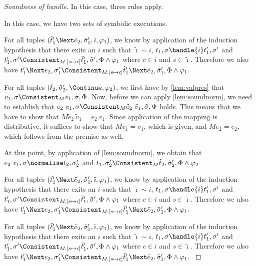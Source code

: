 \begin{proof}[Soundness of handle]
{ In this case, three rules apply.\\


{
In this case, we have two sets of symbolic executions.

For all tuples $(\tilde{t}_1'\Next \tilde{e}_2,\tilde{\sigma}_1',\tilde{\imath},\phi_1)$, we know by application of the induction hypothesis that
there exits an $i$ such that $\tilde{\imath}\sim i$, $t_1,\sigma\handle{i}t_1',\sigma'$ and
$t_1',\sigma'\Consistent_{M.[s\mapsto c]}\tilde{t}_1',\tilde{\sigma}',\Phi\land\phi_1$ where $c\in i$ and $s\in \tilde{\imath}$.
Therefore we also have $t_1'\Next e_2,\sigma_1'\Consistent_{M.[s\mapsto c]}\tilde{t}_1'\Next \tilde{e}_2,\tilde{\sigma}_1',\Phi\land\phi_1$.

For all tuples $(\tilde{t}_2,\tilde{\sigma}_2',\Continue,\phi_2)$, we first have by \cref{lem:valpres} that
$v_1,\sigma\Consistent_M\tilde{v}_1,\tilde{\sigma},\Phi$.
Now, before we can apply \cref{lem:soundnorm}, we need to establish that
$e_2\ v_1,\sigma\Consistent_M\tilde{e}_2\ \tilde{v}_1,\tilde{\sigma},\Phi$ holds.
This means that we have to show that $M \tilde{e}_2\ \tilde{v}_1 = e_2\ v_1$.
Since application of the mapping is distributive, it suffices to show that $M\tilde{v}_1=v_1$, which is given,
and $M\tilde{e}_2=e_2$, which follows from the premise as well.

At this point, by application of \cref{lem:soundnorm}, we obtain that $e_2\ v_1,\sigma\normalise t_2,\sigma_2'$
and $t_1,\sigma_2'\Consistent_M\tilde{t}_2,\tilde{\sigma}_2',\Phi\land\phi_2$
}

{
For all tuples $(\tilde{t}_1'\Next \tilde{e}_2,\tilde{\sigma}_1',\tilde{\imath},\phi_1)$, we know by application of the induction hypothesis that
there exits an $i$ such that $\tilde{\imath}\sim i$, $t_1,\sigma\handle{i}t_1',\sigma'$ and
$t_1',\sigma'\Consistent_{M.[s\mapsto c]}\tilde{t}_1',\tilde{\sigma}',\Phi\land\phi_1$ where $c\in i$ and $s\in \tilde{\imath}$.
Therefore we also have $t_1'\Next e_2,\sigma_1'\Consistent_{M.[s\mapsto c]}\tilde{t}_1'\Next \tilde{e}_2,\tilde{\sigma}_1',\Phi\land\phi_1$.
}

{
For all tuples $(\tilde{t}_1'\Next \tilde{e}_2,\tilde{\sigma}_1',\tilde{\imath},\phi_1)$, we know by application of the induction hypothesis that
there exits an $i$ such that $\tilde{\imath}\sim i$, $t_1,\sigma\handle{i}t_1',\sigma'$ and
$t_1',\sigma'\Consistent_{M.[s\mapsto c]}\tilde{t}_1',\tilde{\sigma}',\Phi\land\phi_1$ where $c\in i$ and $s\in \tilde{\imath}$.
Therefore we also have $t_1'\Next e_2,\sigma_1'\Consistent_{M.[s\mapsto c]}\tilde{t}_1'\Next \tilde{e}_2,\tilde{\sigma}_1',\Phi\land\phi_1$.
}
}


\end{proof}
